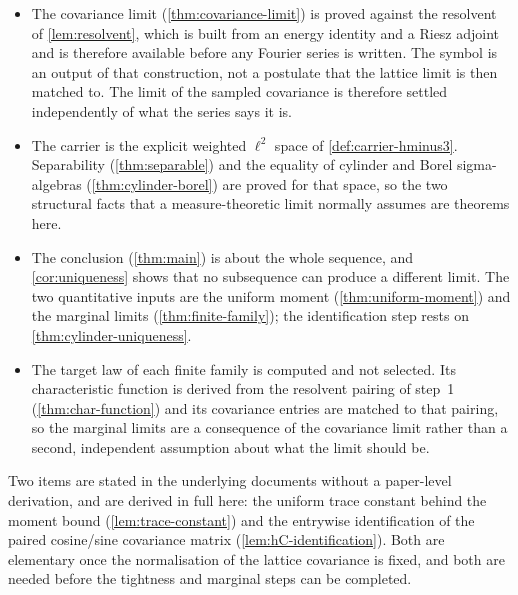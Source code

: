 \begin{itemize}
\item The covariance limit (\cref{thm:covariance-limit}) is proved against the
  resolvent of \cref{lem:resolvent}, which is built from an energy identity and
  a Riesz adjoint and is therefore available before any Fourier series is
  written.  The symbol is an output of that construction, not a postulate that
  the lattice limit is then matched to.  The limit of the sampled covariance is
  therefore settled independently of what the series says it is.
\item The carrier is the explicit weighted $\ell^2$ space of
  \cref{def:carrier-hminus3}.  Separability (\cref{thm:separable}) and the
  equality of cylinder and Borel sigma-algebras (\cref{thm:cylinder-borel}) are
  proved for that space, so the two structural facts that a measure-theoretic
  limit normally assumes are theorems here.
\item The conclusion (\cref{thm:main}) is about the whole sequence, and
  \cref{cor:uniqueness} shows that no subsequence can produce a different limit.
  The two quantitative inputs are the uniform moment (\cref{thm:uniform-moment})
  and the marginal limits (\cref{thm:finite-family}); the identification step
  rests on \cref{thm:cylinder-uniqueness}.
\item The target law of each finite family is computed and not selected.  Its
  characteristic function is derived from the resolvent pairing of step~1
  (\cref{thm:char-function}) and its covariance entries are matched to that
  pairing, so the marginal limits are a consequence of the covariance limit
  rather than a second, independent assumption about what the limit should be.
\end{itemize}

Two items are stated in the underlying documents without a paper-level
derivation, and are derived in full here: the uniform trace constant behind the
moment bound (\cref{lem:trace-constant}) and the entrywise identification of the
paired cosine/sine covariance matrix (\cref{lem:hC-identification}).  Both are
elementary once the normalisation of the lattice covariance is fixed, and both
are needed before the tightness and marginal steps can be completed.

